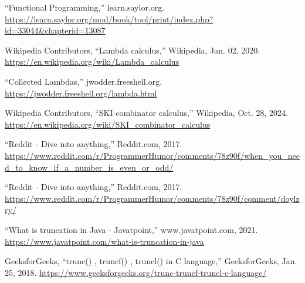 \documentclass[12pt]{report} %
\begin{document}
\begin{singlespace}
\begin{thebibliography}{}
             “Functional Programming,” learn.saylor.org. \href{https://learn.saylor.org/mod/book/tool/print/index.php?id=33044&chapterid=13087}{https://learn.saylor.org/mod/book/tool/print/\-index.php?id=33044\&chapterid=13087}

             Wikipedia Contributors, “Lambda calculus,” Wikipedia, Jan. 02, 2020. \href{https://en.wikipedia.org/wiki/Lambda_calculus}{https://en.wikipedia.org/wiki/Lambda\_calculus}

             “Collected Lambdas,” jwodder.freeshell.org. \href{https://jwodder.freeshell.org/lambda.html}{https://jwodder.freeshell.org/lambda.html}

             Wikipedia Contributors, “SKI combinator calculus,” Wikipedia, Oct. 28, 2024. \href{https://en.wikipedia.org/wiki/SKI_combinator_calculus}{https://en.wikipedia.org/wiki/SKI\_combinator\_calculus}

             “Reddit - Dive into anything,” Reddit.com, 2017. \href{https://www.reddit.com/r/ProgrammerHumor/comments/78z90f/when_you_need_to_know_if_a_number_is_even_or_odd/}{https://www.reddit.com/r/ProgrammerHu\-mor/comments/78z90f/when\_you\_need\_to\_know\_if\_a\_number\_is\_even\_or\_odd/} 

             “Reddit - Dive into anything,” Reddit.com, 2017. \href{https://www.reddit.com/r/ProgrammerHumor/comments/78z90f/comment/doylzry/}{https://www.reddit.com/r/ProgrammerHu\-mor/comments/78z90f/comment/doylzry/}

             “What is truncation in Java - Javatpoint,” www.javatpoint.com, 2021. \href{https://www.javatpoint.com/what-is-truncation-in-java}{https://www.javatpoint.com/what-is-truncation-in-java}

             GeeksforGeeks, “trunc() , truncf() , truncl() in C language,” GeeksforGeeks, Jan. 25, 2018. \href{https://www.geeksforgeeks.org/trunc-truncf-truncl-c-language/}{https://www.geeksforgeeks.org/trunc-truncf-truncl-c-language/}



        \end{thebibliography}
    
    \end{singlespace}
\end{document}
